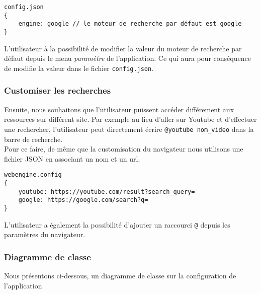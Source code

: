 \documentclass[10pt,a4paper]{article}
\begin{document}
\begin{verbatim}
config.json
{
    engine: google // le moteur de recherche par défaut est google
}
\end{verbatim}

L'utilisateur à la possibilité de modifier la valeur du moteur de recherche par défaut depuis le menu \textit{paramètre} de l'application. Ce qui aura pour conséquence de modifie la valeur dans le fichier \verb|config.json|.

\subsubsection{Customiser les recherches}
Ensuite, nous souhaitons que l'utilisateur puissent accéder différement aux ressources sur différent site. Par exemple au lieu d'aller sur Youtube et d'effectuer une rechercher, l'utilisateur peut directement écrire \verb|@youtube nom_video| dans la barre de recherche. \\
Pour ce faire, de même que la customisation du navigateur nous utilisons une fichier JSON en associant un nom et un url.
\begin{verbatim}
webengine.config
{
    youtube: https://youtube.com/result?search_query=
    google: https://google.com/search?q=
}
\end{verbatim}

L'utilisateur a également la possibilité d'ajouter un raccourci \verb|@| depuis les paramètres du navigateur.


\subsubsection{Diagramme de classe}
Nous présentons ci-dessous, un diagramme de classe sur la configuration de l'application
\end{document}
